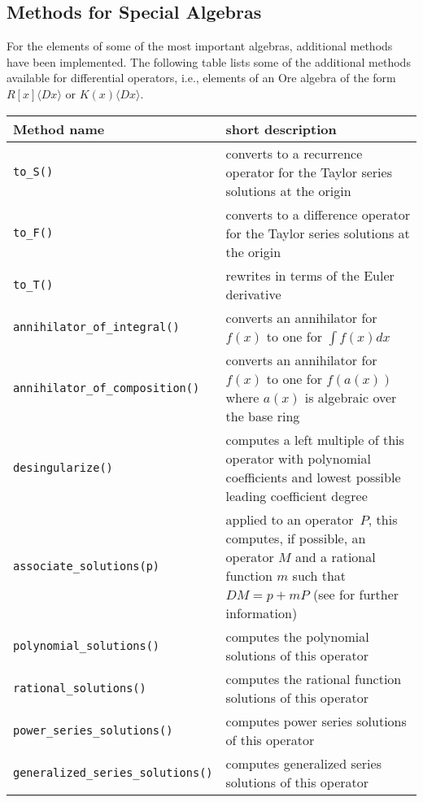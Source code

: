 \documentclass[11pt]{amsart}
\def\<#1>{\langle#1\rangle}
\begin{document}
\subsection{Methods for Special Algebras}

For the elements of some of the most important algebras, additional methods have
been implemented. The following table lists some of the additional methods
available for differential operators, i.e., elements of an Ore algebra of the
form~$R[x]\<Dx>$ or $K(x)\<Dx>$.

\begin{center}
  \begin{tabular}{|l|p{.55\hsize}|}
    \hline
    Method name & short description \\\hline
    \verb|to_S()| & converts to a recurrence operator for the Taylor series solutions at the origin \\
    \verb|to_F()| & converts to a difference operator for the Taylor series solutions at the origin \\
    \verb|to_T()| & rewrites in terms of the Euler derivative \\
    \verb|annihilator_of_integral()| & converts an annihilator for $f(x)$ to one for $\int f(x) dx$\\
    \verb|annihilator_of_composition()| & converts an annihilator for $f(x)$ to one for $f(a(x))$ where $a(x)$ is algebraic over the base ring\\
    \verb|desingularize()| & computes a left multiple of this operator with polynomial coefficients and 
           lowest possible leading coefficient degree\\
    \verb|associate_solutions(p)| & applied to an operator~$P$, this computes, if possible, an operator $M$
    and a rational function $m$ such that $DM=p+mP$ (see \cite{abramov99} for further information)\\
    \verb|polynomial_solutions()| & computes the polynomial solutions of this operator\\
    \verb|rational_solutions()| & computes the rational function solutions of this operator\\
    \verb|power_series_solutions()| & computes power series solutions of this operator\\
    \verb|generalized_series_solutions()| & computes generalized series solutions of this operator \\ \hline
  \end{tabular}
\end{center}
\end{document}
